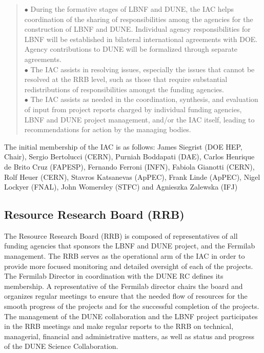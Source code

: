 \begin{quote}
$\bullet$ During the formative stages of LBNF and DUNE,
the IAC helps coordination of the sharing of responsibilities among
the agencies for the construction of LBNF and DUNE.
Individual agency responsibilities for LBNF will be established in
bilateral international agreements with DOE. Agency contributions to
DUNE will be formalized through separate agreements.\\
$\bullet$ The IAC assists in resolving issues, especially the
issues that cannot be resolved at the RRB level, such as those that
require substantial redistributions of responsibilities amongst the
funding agencies.\\
$\bullet$ The IAC assists as needed in the coordination,
synthesis, and evaluation of input from project reports charged by
individual funding agencies, LBNF and DUNE project management,
and/or the IAC itself, leading to recommendations for action by
the managing bodies.
\end{quote}

The initial membership of the IAC is as follows:
James Siegrist (DOE HEP, Chair),
Sergio Bertolucci (CERN),
Purniah Boddapati (DAE),
Carlos Henrique de Brito Cruz (FAPESP),
Fernando Ferroni (INFN),
Fabiola Gianotti (CERN),
Rolf Heuer (CERN),
Stavros Katsanevas (ApPEC),
Frank Linde (ApPEC),
Nigel Lockyer (FNAL),
John Womersley (STFC) and
Agnieszka Zalewska (IFJ)

\subsection{Resource Research Board (RRB)}

The Resource Research Board (RRB) is composed of representatives of all
funding agencies that sponsors the LBNF and DUNE project, and the Fermilab
management. The RRB serves as the operational arm of the IAC
in order to provide more focused monitoring and detailed oversight
of each of the projects. The Fermilab Director in coordination
with the DUNE RC defines its membership. A representative of the
Fermilab director chairs the board and
organizes regular meetings to ensure that the needed flow of resources
for the smooth progress of the projects and for the successful completion
of the projects. The management of the
DUNE collaboration and the LBNF project participates in the RRB meetings
and make regular reports to the RRB on technical, managerial,
financial and administrative matters, as well as status and
progress of the DUNE Science Collaboration.


